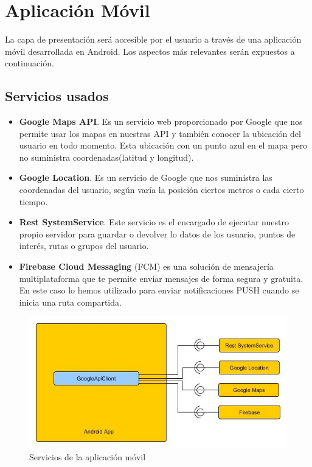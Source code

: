 	
	
	
\section{Aplicación Móvil}
La capa de presentación será accesible por el usuario a través de una aplicación móvil desarrollada en Android. Los aspectos más relevantes serán expuestos a continuación.

\subsection{Servicios usados}
\begin{itemize}
\item \textbf{Google Maps API}. Es un servicio web proporcionado por Google que nos permite usar los mapas en nuestras API y también conocer la ubicación del usuario  en todo momento. Esta ubicación  con un punto azul en el mapa pero no suministra coordenadas(latitud y longitud).
\item \textbf{Google Location}. Es un servicio de Google que nos suministra las coordenadas del usuario, según varía la posición ciertos metros o cada cierto tiempo.
\item \textbf{Rest SystemService}. Este servicio es el encargado de ejecutar nuestro propio servidor para guardar o devolver lo datos de los usuario, puntos de interés, rutas o grupos del usuario.
\item \textbf{Firebase Cloud Messaging} (FCM) es una solución de mensajería multiplataforma que te permite enviar mensajes de forma segura y gratuita. En este caso lo hemos utilizado para enviar notificaciones PUSH cuando se inicia una ruta compartida.
\end{itemize}
\begin{figure}[H]
		\centering
		\includegraphics[width=\textwidth] {arquitectura-movil.jpg}
		\caption{Servicios de la aplicación móvil }
		\label{fig:arquitectura-movil}
	\end{figure}
	
